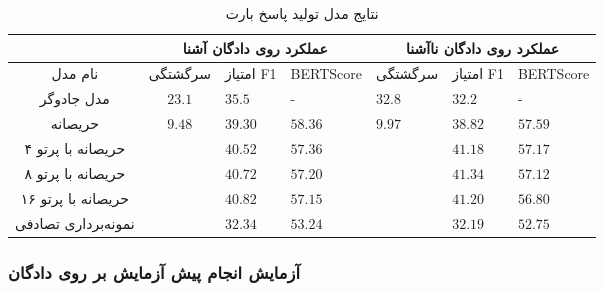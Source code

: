 \begin{table}[htb]
	\caption{نتایج مدل تولید پاسخ بارت}
	\label{table:bart_plain}
	\begin{tabular}{|c|c|l|l|l|l|l|}
		\hline
		\multicolumn{1}{|l|}{}                    & \multicolumn{3}{c|}{عملکرد روی دادگان آشنا}                            & \multicolumn{3}{c|}{عملکرد روی دادگان نا‌آشنا}                         \\ \hline
		نام مدل                                   & سرگشتگی                          & امتیاز F1        & BERTScore        & سرگشتگی                          & امتیاز F1        & BERTScore        \\ \hline
		مدل جادوگر                                & $23.1$                           & $35.5$           & -                & $32.8$                           & $32.2$           & -                \\ \hline
		حریصانه                                   & \multirow{5}{*}{$\mathbf{9.48}$} & $39.30$          & $\mathbf{58.36}$ & \multirow{5}{*}{$\mathbf{9.97}$} & $38.82$          & $\mathbf{57.59}$ \\ \cline{1-1}
		حریصانه با پرتو ۴                         &                                  & $40.52$          & $57.36$          &                                  & $41.18$          & $57.17$          \\ \cline{1-1}
		حریصانه با پرتو ۸                         &                                  & $40.72$          & $57.20$          &                                  & $\mathbf{41.34}$ & $57.12$          \\ \cline{1-1}
		حریصانه با پرتو ۱۶                        &                                  & $\mathbf{40.82}$ & $57.15$          &                                  & $41.20$          & $56.80$          \\ \cline{1-1}
		\multicolumn{1}{|l|}{نمونه‌برداری تصادفی} &                                  & $32.34$          & $53.24$          &                                  & $32.19$          & $52.75$          \\ \hline
	\end{tabular}
\end{table}


\subsubsection{آزمایش انجام پیش آزمایش بر روی دادگان
}

